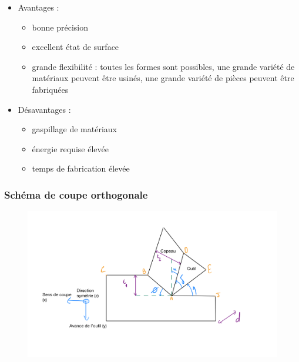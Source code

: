 \documentclass[../main.tex]{subfiles}
\begin{document}
\begin{itemize}
    \item Avantages : \begin{itemize}
        \item bonne précision\\
        \item excellent état de surface\\
        \item grande flexibilité : toutes les formes sont possibles, une grande variété de matériaux peuvent être usinés, une grande variété de pièces peuvent être fabriquées\\
    \end{itemize}
    \item Désavantages : \begin{itemize}
        \item gaspillage de matériaux\\
        \item énergie requise élevée\\
        \item temps de fabrication élevée\\
    \end{itemize}
\end{itemize}

\subsubsection{Schéma de coupe orthogonale}
\begin{figure}[hbt!]
    \centering
    \includegraphics[width=.8\textwidth]{IMAGES/procprod/coupeortho.png}
\end{figure}
\end{document}
